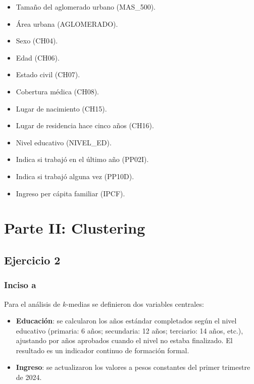 \documentclass[11pt,a4paper]{article}
\begin{document}
\begin{itemize}
  \item Tamaño del aglomerado urbano (MAS\_500).
  \item Área urbana (AGLOMERADO).
  \item Sexo (CH04).
  \item Edad (CH06).
  \item Estado civil (CH07).
  \item Cobertura médica (CH08).
  \item Lugar de nacimiento (CH15).
  \item Lugar de residencia hace cinco años (CH16).
  \item Nivel educativo (NIVEL\_ED).
  \item Indica si trabajó en el último año (PP02I).
  \item Indica si trabajó alguna vez (PP10D).
  \item Ingreso per cápita familiar (IPCF).
\end{itemize}

\section*{Parte II: Clustering}

\subsection*{Ejercicio 2}

\subsubsection*{Inciso a}

Para el análisis de $k$-medias se definieron dos variables centrales:

\begin{itemize}
  \item \textbf{Educación}: se calcularon los años estándar completados según el nivel
        educativo (primaria: 6 años; secundaria: 12 años; terciario: 14 años, etc.),
        ajustando por años aprobados cuando el nivel no estaba finalizado. El resultado es un
        indicador continuo de formación formal.
  \item \textbf{Ingreso}: se actualizaron los valores a pesos constantes del primer trimestre
        de 2024.
\end{itemize}
\end{document}
